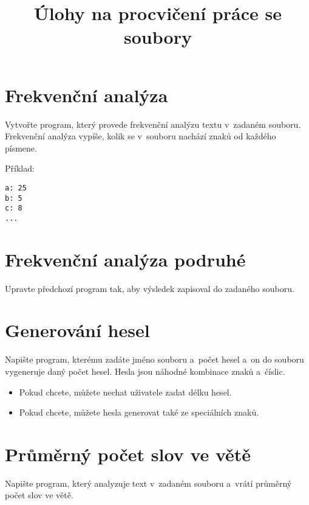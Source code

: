 \documentclass[12pt,a4paper]{article}
\begin{document}
\pagestyle{plain}
\title{Úlohy na procvičení práce se soubory}
\date{\vspace{-10ex}}
\setlength{\droptitle}{-6em}
\maketitle

\setlength\parindent{0pt}

\section{Frekvenční analýza}

Vytvořte program, který provede frekvenční analýzu textu v~zadaném souboru.
Frekvenční analýza vypíše, kolik se v~souboru nachází znaků od každého písmene.

Příklad:

\begin{verbatim}
a: 25
b: 5
c: 8
...
\end{verbatim}

\section{Frekvenční analýza podruhé}

Upravte předchozí program tak, aby výsledek zapisoval do zadaného souboru.

\section{Generování hesel}

Napište program, kterému zadáte jméno souboru a~počet hesel a~on do souboru
vygeneruje daný počet hesel. Hesla jsou náhodné kombinace znaků a~číslic.

\begin{itemize}[noitemsep,nolistsep]
	\item Pokud chcete, můžete nechat uživatele zadat délku hesel.
	\item Pokud chcete, můžete hesla generovat také ze speciálních znaků.
\end{itemize}

\section{Průměrný počet slov ve větě}

Napište program, který analyzuje text v~zadaném souboru a~vrátí průměrný počet
slov ve větě.
\end{document}

